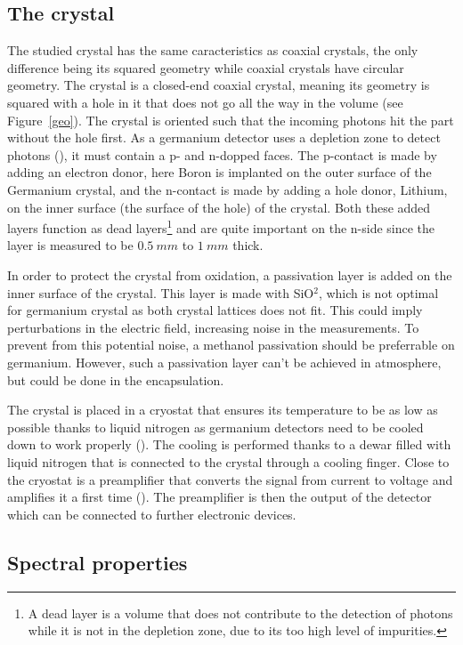 \documentclass[11pt,a4paper]{article}
\begin{document}
\subsection{The crystal}

The studied crystal has the same caracteristics as coaxial crystals, the only difference being its squared geometry while coaxial crystals have circular geometry. The crystal is a closed-end coaxial crystal, meaning its geometry is squared with a hole in it that does not go all the way in the volume (see Figure~\ref{geo}). The crystal is oriented such that the incoming photons hit the part without the hole first. As a germanium detector uses a depletion zone to detect photons (\cite{phot}), it must contain a p- and n-dopped faces. The p-contact is made by adding an electron donor, here Boron is implanted on the outer surface of the Germanium crystal, and the n-contact is made by adding a hole donor, Lithium, on the inner surface (the surface of the hole) of the crystal. Both these added layers function as dead layers\footnote{A dead layer is a volume that does not contribute to the detection of photons while it is not in the depletion zone, due to its too high level of impurities.} and are quite important on the n-side since the layer is measured to be $0.5~mm$ to $1~mm$ thick.

In order to protect the crystal from oxidation, a passivation layer is added on the inner surface of the crystal. This layer is made with SiO$^2$, which is not optimal for germanium crystal as both crystal lattices does not fit. This could imply perturbations in the electric field, increasing noise in the measurements. To prevent from this potential noise, a methanol passivation should be preferrable on germanium. However, such a passivation layer can't be achieved in atmosphere, but could be done in the encapsulation.

The crystal is placed in a cryostat that ensures its temperature to be as low as possible thanks to liquid nitrogen as germanium detectors need to be cooled down to work properly (\cite{Knoll}). The cooling is performed thanks to a dewar filled with liquid nitrogen that is connected to the crystal through a cooling finger. Close to the cryostat is a preamplifier that converts the signal from current to voltage and amplifies it a first time (\cite{Tsoulfanidis}). The preamplifier is then the output of the detector which can be connected to further electronic devices.

\subsection{Spectral properties} \label{spectral}
\end{document}
